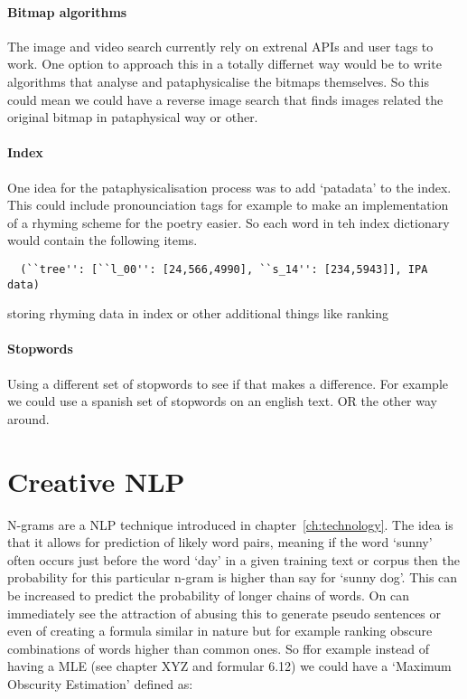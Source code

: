 \paragraph{Bitmap algorithms}
The image and video search currently rely on extrenal \ac{API}s and user tags to work. One option to approach this in a totally differnet way would be to write algorithms that analyse and pataphysicalise the bitmaps themselves. So this could mean we could have a reverse image search that finds images related the original bitmap in pataphysical way or other.

\paragraph{Index}
One idea for the pataphysicalisation process was to add `patadata' to the index. This could include pronounciation tags for example to make an implementation of a rhyming scheme for the poetry easier. So each word in teh index dictionary would contain the following items.

\begin{verbatim}
  (``tree'': [``l_00'': [24,566,4990], ``s_14'': [234,5943]], IPA data)
\end{verbatim}

storing rhyming data in index or other additional things like ranking

\paragraph{Stopwords}
Using a different set of stopwords to see if that makes a difference. For example we could use a spanish set of stopwords on an english text. OR the other way around.


\section{Creative NLP}
N-grams are a \ac{NLP} technique introduced in chapter~\ref{ch:technology}. The idea is that it allows for prediction of likely word pairs, meaning if the word `sunny' often occurs just before the word `day' in a given training text or corpus then the probability for this particular n-gram is higher than say for `sunny dog'. This can be increased to predict the probability of longer chains of words. On can immediately see the attraction of abusing this to generate pseudo sentences or even of creating a formula similar in nature but for example ranking obscure combinations of words higher than common ones. So ffor example instead of having a \ac{MLE} (see chapter XYZ and formular 6.12) we could have a `Maximum Obscurity Estimation' defined as:

